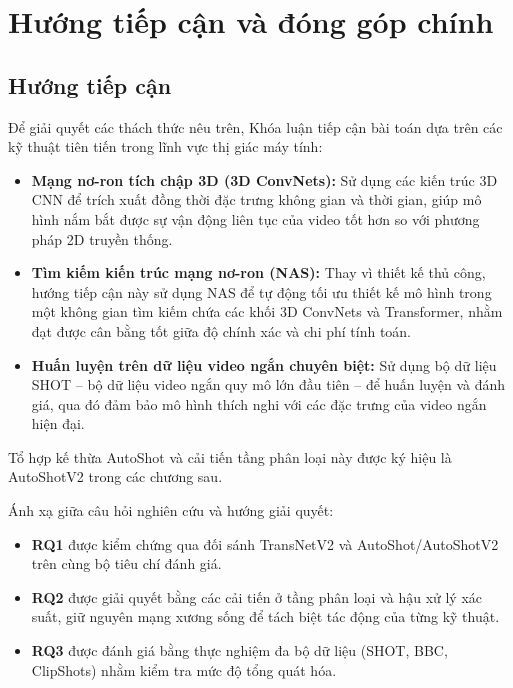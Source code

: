 \section{Hướng tiếp cận và đóng góp chính}
\label{sec:approach_contribution}

\subsection{Hướng tiếp cận}
Để giải quyết các thách thức nêu trên, Khóa luận tiếp cận bài toán dựa trên các kỹ thuật tiên tiến trong lĩnh vực thị giác máy tính:
\begin{itemize}
    \item \textbf{Mạng nơ-ron tích chập 3D (3D ConvNets):} Sử dụng các kiến trúc 3D CNN để trích xuất đồng thời đặc trưng không gian và thời gian, giúp mô hình nắm bắt được sự vận động liên tục của video tốt hơn so với phương pháp 2D truyền thống.
    \item \textbf{Tìm kiếm kiến trúc mạng nơ-ron (NAS):} Thay vì thiết kế thủ công, hướng tiếp cận này sử dụng NAS để tự động tối ưu thiết kế mô hình trong một không gian tìm kiếm chứa các khối 3D ConvNets và Transformer, nhằm đạt được cân bằng tốt giữa độ chính xác và chi phí tính toán.
    \item \textbf{Huấn luyện trên dữ liệu video ngắn chuyên biệt:} Sử dụng bộ dữ liệu SHOT \cite{zhu2023autoshot} -- bộ dữ liệu video ngắn quy mô lớn đầu tiên -- để huấn luyện và đánh giá, qua đó đảm bảo mô hình thích nghi với các đặc trưng của video ngắn hiện đại.
\end{itemize}

\noindent
Tổ hợp kế thừa AutoShot và cải tiến tầng phân loại này được ký hiệu là AutoShotV2 trong các chương sau.

\noindent
Ánh xạ giữa câu hỏi nghiên cứu và hướng giải quyết:
\begin{itemize}
    \item \textbf{RQ1} được kiểm chứng qua đối sánh TransNetV2 và AutoShot/AutoShotV2 trên cùng bộ tiêu chí đánh giá.
    \item \textbf{RQ2} được giải quyết bằng các cải tiến ở tầng phân loại và hậu xử lý xác suất, giữ nguyên mạng xương sống để tách biệt tác động của từng kỹ thuật.
    \item \textbf{RQ3} được đánh giá bằng thực nghiệm đa bộ dữ liệu (SHOT, BBC, ClipShots) nhằm kiểm tra mức độ tổng quát hóa.
\end{itemize}

